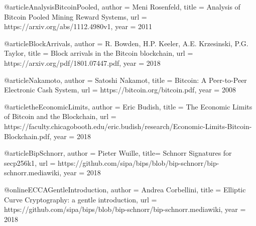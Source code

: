 @article{AnalysisBitcoinPooled,
  author = {Meni Rosenfeld},
  title  = {Analysis of Bitcoin Pooled Mining Reward Systems},
  url    = {https://arxiv.org/abs/1112.4980v1},
  year   = {2011}
}

@article{BlockArrivals,
  author = {R. Bowden, H.P. Keeler, A.E. Krzesinski, P.G. Taylor},
  title  = {Block arrivals in the Bitcoin blockchain},
  url    = {https://arxiv.org/pdf/1801.07447.pdf},
  year   = {2018}
}

@article{Nakamoto,
  author = {Satoshi Nakamot},
  title  = {Bitcoin: A Peer-to-Peer Electronic Cash System},
  url    = {https://bitcoin.org/bitcoin.pdf},
  year   = {2008}
}

@article{theEconomicLimits,
  author = {Eric Budish},
  title  = {The Economic Limits of Bitcoin and the Blockchain},
  url    = {https://faculty.chicagobooth.edu/eric.budish/research/Economic-Limits-Bitcoin-Blockchain.pdf},
  year   = {2018}
}

@article{BipSchnorr,
  author = {Pieter Wuille},
  title= {Schnorr Signatures for secp256k1},
  url    = {https://github.com/sipa/bips/blob/bip-schnorr/bip-schnorr.mediawiki},
  year   = {2018}
}

@online{ECCAGentleIntroduction,
  author = {Andrea Corbellini},
  title = {Elliptic Curve Cryptography: a gentle introduction},
  url    = {https://github.com/sipa/bips/blob/bip-schnorr/bip-schnorr.mediawiki},
  year   = {2018}
}